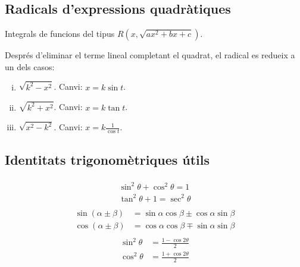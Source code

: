 \subsection{Radicals d'expressions quadràtiques}
Integrals de funcions del tipus $R(x , \sqrt{ax^{2} + bx + c})$.

Després d'eliminar el terme lineal completant el quadrat, el radical es redueix a un dels casos:
\begin{enumerate}[i)]
    \item $\sqrt{k^{2}-x^{2}}$. Canvi: $x = k \sin t$.
    \item $\sqrt{k^{2}+x^{2}}$. Canvi: $x = k \tan t$.
    \item $\sqrt{x^{2}-k^{2}}$. Canvi: $x = k \frac{1}{\cos t}$.
\end{enumerate}

\subsection{Identitats trigonomètriques útils}
\begin{align}
\begin{split}
    \sin ^{2} \theta + \cos ^{2} \theta = 1 \\
    \tan ^{2} \theta + 1 = \sec ^2 \theta
\end{split}
\end{align}
\begin{align}
\begin{split}
    \sin (\alpha \pm \beta) &= \sin \alpha \cos \beta \pm \cos \alpha \sin \beta \\
    \cos (\alpha \pm \beta) &= \cos \alpha \cos \beta \mp \sin \alpha \sin \beta
\end{split}
\end{align}
\begin{align}
\begin{split}
    \sin^{2} \theta &= \frac{1 - \cos 2 \theta}{2} \\
    \cos^{2} \theta &= \frac{1 + \cos 2 \theta}{2}
\end{split}
\end{align}

